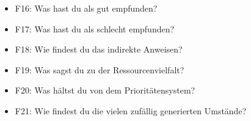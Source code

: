 \begin{itemize}
    \item F16: Was hast du als gut empfunden?
    \item F17: Was hast du als schlecht empfunden?
    \item F18: Wie findest du das indirekte Anweisen?
    \item F19: Was sagst du zu der Ressourcenvielfalt?
    \item F20: Was hältst du von dem Prioritätensystem?
    \item F21: Wie findest du die vielen zufällig generierten Umstände?
\end{itemize}

